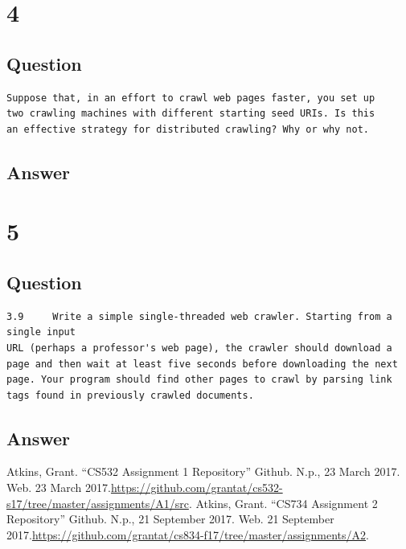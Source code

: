 \documentclass[letterpaper,11pt]{article}
\begin{document}
\clearpage


\section*{4}

\subsection*{Question}

\begin{verbatim}
Suppose that, in an effort to crawl web pages faster, you set up
two crawling machines with different starting seed URIs. Is this
an effective strategy for distributed crawling? Why or why not.
\end{verbatim}

\subsection*{Answer}


\clearpage


\section*{5}

\subsection*{Question}

\begin{verbatim}
3.9 	Write a simple single-threaded web crawler. Starting from a single input
URL (perhaps a professor's web page), the crawler should download a
page and then wait at least five seconds before downloading the next
page. Your program should find other pages to crawl by parsing link
tags found in previously crawled documents.
\end{verbatim}

\subsection*{Answer}


\clearpage



\begin{thebibliography}{9}
Atkins, Grant. ``CS532 Assignment 1 Repository'' Github. N.p., 23 March 2017. Web. 23 March 2017.\url{https://github.com/grantat/cs532-s17/tree/master/assignments/A1/src}.
Atkins, Grant. ``CS734 Assignment 2 Repository'' Github. N.p., 21 September 2017. Web. 21 September 2017.\url{https://github.com/grantat/cs834-f17/tree/master/assignments/A2}.
\end{thebibliography}
\end{document}
